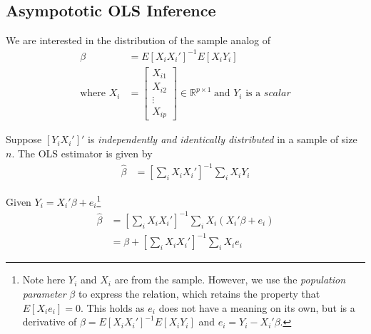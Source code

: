 \documentclass[12pt]{article}
\begin{document}
\noindent {\Large \textcolor{titlecolor}{SOC 690S Machine Learning in Causal Inference \\[3pt] Week 1 Supplements}}\\[0pt]

\subsection{Asympototic OLS Inference}

We are interested in the distribution of the sample analog of 
\begin{align*}
    \beta &= E[X_iX_i']^{-1}E[X_iY_i] \\
    \text{where } X_i &=
    \begin{bmatrix}
    X_{i1} \\
    X_{i2} \\
    \vdots \\
    X_{ip}
    \end{bmatrix}
    \in \mathbb{R}^{p\times 1} \hspace{3pt} 
    \text{and } Y_i \text{ is a } \textit{scalar}
\end{align*}

Suppose $[Y_i X_i']'$ is \textit{independently and identically distributed} in a sample of size $n$. The OLS estimator is given by
\begin{align*}
    \hat{\beta} &= \left[\sum_i X_i X_i' \right]^{-1} \sum_i X_i Y_i
\end{align*}

Given $Y_i = X_i'\beta + e_i$\footnote{Note here $Y_i$ and $X_i$ are from the sample. However, we use the \textit{population parameter} $\beta$ to express the relation, which retains the property that $E[X_ie_i]=0$. This holds as $e_i$ does not have a meaning on its own, but is a derivative of $\beta = E[X_iX_i']^{-1}E[X_iY_i]$ and $e_i=Y_i - X_i'\beta$.}
\begin{align*}
    \hat{\beta} &= \left[\sum_i X_i X_i' \right]^{-1} \sum_i X_i \left( X_i'\beta + e_i \right) \\
    &= \beta + \left[\sum_i X_i X_i' \right]^{-1} \sum_i X_ie_i
\end{align*}
\end{document}
